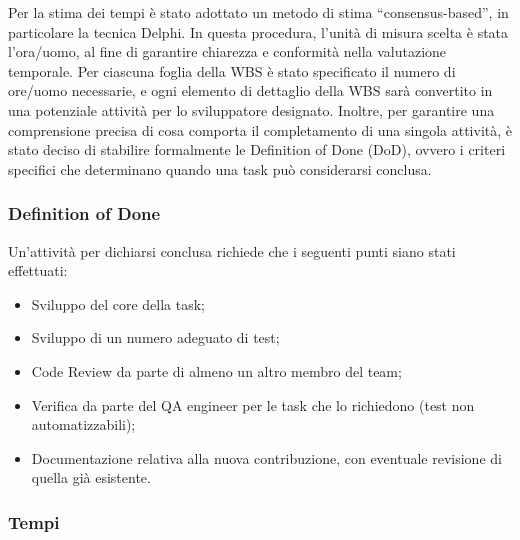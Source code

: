 \documentclass[a4paper,12pt, openright]{report}
\begin{document}
Per la stima dei tempi è stato adottato un metodo di stima ``consensus-based'', in particolare la tecnica Delphi. In questa procedura, l'unità di misura scelta è stata l'ora/uomo, al fine di garantire chiarezza e conformità nella valutazione temporale.
Per ciascuna foglia della WBS è stato specificato il numero di ore/uomo necessarie, e ogni elemento di dettaglio della WBS sarà convertito in una potenziale attività per lo sviluppatore designato.
Inoltre, per garantire una comprensione precisa di cosa comporta il completamento di una singola attività, è stato deciso di stabilire formalmente le Definition of Done (DoD), ovvero i criteri specifici che determinano quando una task può considerarsi conclusa.

\subsubsection{Definition of Done}
Un'attività per dichiarsi conclusa richiede che i seguenti punti siano stati effettuati:
\begin{itemize}
    \item Sviluppo del core della task;
    \item Sviluppo di un numero adeguato di test;
    \item Code Review da parte di almeno un altro membro del team;
    \item Verifica da parte del QA engineer per le task che lo richiedono (test non automatizzabili);
    \item Documentazione relativa alla nuova contribuzione, con eventuale revisione di quella già esistente.
\end{itemize}

\subsubsection{Tempi}
\end{document}
